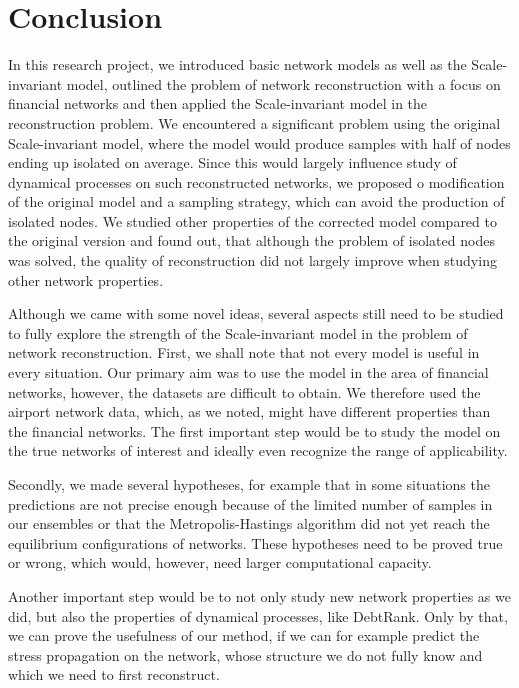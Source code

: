 \chapter*{Conclusion} %
In this research project, we introduced basic network models as well as the Scale-invariant model, outlined the problem of network reconstruction with a focus on financial networks and then applied the Scale-invariant model in the reconstruction problem. We encountered a significant problem using the original Scale-invariant model, where the model would produce samples with half of nodes ending up isolated on average. Since this would largely influence study of dynamical processes on such reconstructed networks, we proposed o modification of the original model and a sampling strategy, which can avoid the production of isolated nodes. We studied other properties of the corrected model compared to the original version and found out, that although the problem of isolated nodes was solved, the quality of reconstruction did not largely improve when studying other network properties.

Although we came with some novel ideas, several aspects still need to be studied to fully explore the strength of the Scale-invariant model in the problem of network reconstruction. First, we shall note that not every model is useful in every situation. Our primary aim was to use the model in the area of financial networks, however, the datasets are difficult to obtain. We therefore used the airport network data, which, as we noted, might have different properties than the financial networks. The first important step would be to study the model on the true networks of interest and ideally even recognize the range of applicability.

Secondly, we made several hypotheses, for example that in some situations the predictions are not precise enough because of the limited number of samples in our ensembles or that the Metropolis-Hastings algorithm did not yet reach the equilibrium configurations of networks. These hypotheses need to be proved true or wrong, which would, however, need larger computational capacity. 

Another important step would be to not only study new network properties as we did, but also the properties of dynamical processes, like DebtRank. Only by that, we can prove the usefulness of our method, if we can for example predict the stress propagation on the network, whose structure we do not fully know and which we need to first reconstruct. 

